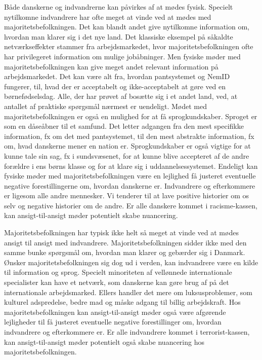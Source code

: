 \documentclass[
]{book}
\begin{document}
Både danskerne og indvandrerne kan påvirkes af at mødes fysisk. Specielt nytilkomne indvandrere har ofte meget at vinde ved at mødes med majoritetsbefolkningen. Det kan blandt andet give nytilkomne information om, hvordan man klarer sig i det nye land. Det klassiske eksempel på såkaldte netværkseffekter stammer fra arbejdsmarkedet, hvor majoritetsbefolkningen ofte har privilegeret information om mulige jobåbninger. Men fysiske møder med majoritetsbefolkningen kan give meget andet relevant information på arbejdsmarkedet. Det kan være alt fra, hvordan pantsystemet og NemID fungerer, til, hvad der er acceptabelt og ikke-acceptabelt at gøre ved en børnefødselsdag. Alle, der har prøvet af bosætte sig i et andet land, ved, at antallet af praktiske spørgsmål nærmest er uendeligt. Mødet med majoritetsbefolkningen er også en mulighed for at få sprogkundskaber. Sproget er som en dåseåbner til et samfund. Det letter adgangen fra den mest specifikke information, fx om det med pantsystemet, til den mest abstrakte information, fx om, hvad danskerne mener en nation er. Sprogkundskaber er også vigtige for at kunne tale sin sag, fx i sundsvæsenet, for at kunne blive accepteret af de andre forældre i ens børns klasse og for at klare sig i uddannelsessystemet. Endeligt kan fysiske møder med majoritetsbefolkningen være en lejlighed få justeret eventuelle negative forestillingerne om, hvordan danskerne er. Indvandrere og efterkommere er ligesom alle andre mennesker. Vi tenderer til at lave positive historier om os selv og negative historier om de andre. Er alle danskere kommet i racisme-kassen, kan ansigt-til-ansigt møder potentielt skabe nuancering.

Majoritetsbefolkningen har typisk ikke helt så meget at vinde ved at mødes ansigt til ansigt med indvandrere. Majoritetsbefolkningen sidder ikke med den samme bunke spørgsmål om, hvordan man klarer og gebærder sig i Danmark. Ønsker majoritetsbefolkningen sig dog ud i verden, kan indvandrere være en kilde til information og sprog. Specielt minoriteten af vellønnede internationale specialister kan have et netværk, som danskerne kan gøre brug af på det internationale arbejdsmarked. Ellers handler det mere om luksusproblemer, som kulturel adspredelse, bedre mad og måske adgang til billig arbejdskraft. Hos majoritetsbefolkningen kan ansigt-til-ansigt møder også være afgørende lejligheder til få justeret eventuelle negative forestillinger om, hvordan indvandrere og efterkommere er. Er alle indvandrere kommet i terrorist-kassen, kan ansigt-til-ansigt møder potentielt også skabe nuancering hos majoritetsbefolkningen.
\end{document}
